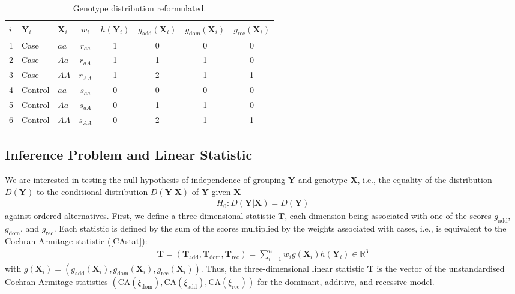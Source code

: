 \documentclass[bimj,fleqn]{w-art}
\newcommand{\R}{\mathbb{R} }
\newcommand{\X}{\mathbf{X}}
\newcommand{\Y}{\mathbf{Y}}
\newcommand{\T}{\mathbf{T}}
\begin{document}
\begin{table}
\begin{center}
\caption{Genotype distribution reformulated. \label{gd}}
\vspace*{0.5cm}
\begin{tabular}{lllc|cccc}
$i$ & $\Y_i$  &  $\X_i$  & $w_i$ & $h(\Y_i)$ & $g_\text{add}(\X_i)$ & $g_\text{dom}(\X_i)$ & $g_\text{rec}(\X_i)$ \\ \hline
1 & Case & $aa$ & $r_{aa}$ & 1 & 0 & 0 & 0 \\
2 & Case & $Aa$ & $r_{aA}$ & 1 & 1 & 1 & 0 \\
3 & Case & $AA$ & $r_{AA}$ & 1 & 2 & 1 & 1 \\
4 & Control & $aa$ & $s_{aa}$ & 0 & 0 & 0 & 0 \\
5 & Control & $Aa$ & $s_{aA}$ & 0 & 1 & 1 & 0 \\
6 & Control & $AA$ & $s_{AA}$ & 0 & 2 & 1 & 1 \\
\hline
\end{tabular}

\end{center}
\end{table}

\subsection{Inference Problem and Linear Statistic}

We are interested in testing the null hypothesis of independence of 
grouping $\Y$ and genotype $\X$, i.e., the equality of the distribution $D(\Y)$ 
to the conditional distribution $D(\Y | \X)$ of $\Y$ given $\X$
\begin{eqnarray*}
H_0: D(\Y | \X) = D(\Y)
\end{eqnarray*}
against ordered alternatives. First, we define a three-dimensional
statistic $\T$, each dimension being associated with one of the 
scores $g_\text{add}$, $g_\text{dom}$, and $g_\text{rec}$.
Each statistic is defined by the sum of the scores multiplied by 
the weights associated with cases, i.e., is equivalent to the 
Cochran-Armitage statistic (\ref{CAstat}):
\begin{eqnarray} \label{linstat}
\T = (\T_\text{add}, \T_\text{dom}, \T_\text{rec}) = 
\sum_{i = 1}^n w_i g(\X_i) h(\Y_i) \in \R^{3} 
\end{eqnarray}
with $g(\X_i) = 
(g_\text{add}(\X_i), g_\text{dom}(\X_i), g_\text{rec}(\X_i))$. Thus, the 
three-dimensional linear statistic $\T$ is the vector of the unstandardised
Cochran-Armitage statistics $(\text{CA}(\xi_\text{dom}), \text{CA}(\xi_\text{add}), 
\text{CA}(\xi_\text{rec}))$ for the dominant, additive, and recessive model.
\end{document}
